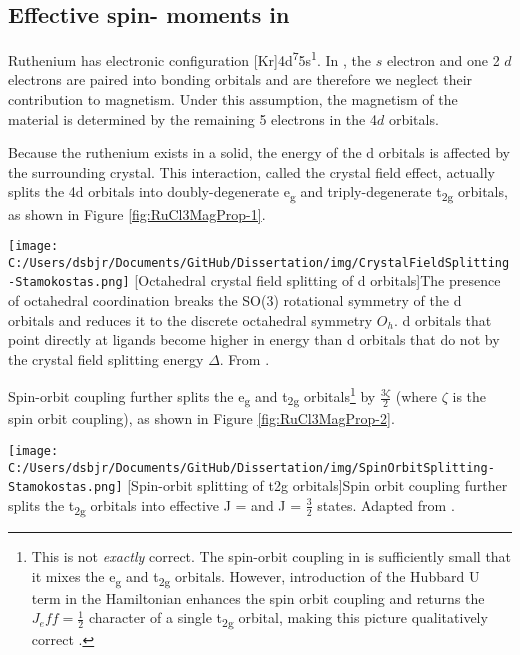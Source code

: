 \subsection{Effective spin-\textonehalf{} moments in \texorpdfstring{\rucl}{RuCl3}}

Ruthenium has electronic configuration [Kr]4d\textsuperscript{7}5s\textsuperscript{1}. In \ruclnospace , the $s$ electron and one 2 $d$ electrons are paired into bonding orbitals and are therefore we neglect their contribution to magnetism. Under this assumption, the magnetism of the material is determined by the remaining 5 electrons in the 4$d$ orbitals.

Because the ruthenium exists in a solid, the energy of the d orbitals is affected by the surrounding crystal. This interaction, called the crystal field effect, actually splits the 4d orbitals into doubly-degenerate e\textsubscript{g} and triply-degenerate t\textsubscript{2g} orbitals, as shown in Figure \ref{fig:RuCl3MagProp-1}.

\begin{centering}
\texttt{[image: C:/Users/dsbjr/Documents/GitHub/Dissertation/img/CrystalFieldSplitting-Stamokostas.png]}
  \captionsetup{width=0.75\textwidth}
  [Octahedral crystal field splitting of d orbitals]{The presence of octahedral coordination breaks the SO(3) rotational symmetry of the d orbitals and reduces it to the discrete octahedral symmetry $O_{h}$. d orbitals that point directly at ligands become higher in energy than d orbitals that do not by the crystal field splitting energy $\Delta$. From \cite{Stamokostas2018}.} 
  \label{fig:RuCl3MagProp-1}
\end{centering}

Spin-orbit coupling further splits the e\textsubscript{g} and t\textsubscript{2g} orbitals\footnote{This is not \textit{exactly} correct. The spin-orbit coupling in \rucl is sufficiently small that it mixes the e\textsubscript{g} and t\textsubscript{2g} orbitals. However, introduction of the Hubbard U term in the Hamiltonian enhances the spin orbit coupling and returns the $J_eff = \frac{1}{2}$ character of a single t\textsubscript{2g} orbital, making this picture qualitatively correct \cite{Kim2015}.} by $\frac{3\zeta}{2}$ (where $\zeta$ is the spin orbit coupling), as shown in Figure \ref{fig:RuCl3MagProp-2}.

\begin{centering}
\texttt{[image: C:/Users/dsbjr/Documents/GitHub/Dissertation/img/SpinOrbitSplitting-Stamokostas.png]}
  \captionsetup{width=0.75\textwidth}
  [Spin-orbit splitting of t2g orbitals]{Spin orbit coupling further splits the t\textsubscript{2g} orbitals into effective J = \textonehalf{} and J = $\frac{3}{2}$ states. Adapted from \cite{Stamokostas2018}.} 
  \label{fig:RuCl3MagProp-2}
\end{centering}

